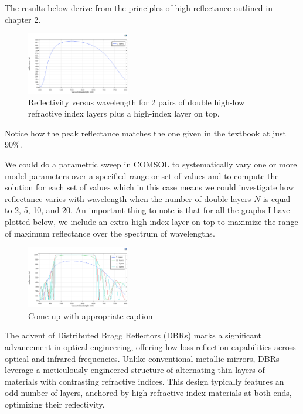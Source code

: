 The results below derive from the principles of high reflectance outlined in chapter 2.

\begin{figure}[ht!]
  \centering
  \includegraphics[width=0.4\textwidth]{Chapters/Figures/Chapter 4 Figures/High-Reflectance (5 Layers).png}
  \caption{Reflectivity versus wavelength for 2 pairs of double high-low refractive index layers plus a high-index layer on top.}
  \label{fig:COMSOL 5 layer results}
\end{figure}

Notice how the peak reflectance matches the one given in the textbook at just 90\%.

We could do a parametric sweep in COMSOL to systematically vary one or more model parameters over a specified range or set of values and to compute the solution for each set of values which in this case means we could investigate how reflectance varies with wavelength when the number of double layers $N$ is equal to 2, 5, 10, and 20. An important thing to note is that for all the graphs I have plotted below, we include an extra high-index layer on top to maximize the range of maximum reflectance over the spectrum of wavelengths.

\begin{figure}[ht!]
  \centering
  \includegraphics[width=0.4\textwidth]{Chapters/Figures/Chapter 4 Figures/High-Reflectance (5, 11, 21, and 41 Layers).png}
  \caption{Come up with appropriate caption}
  \label{fig:Antireflective Figure c}
\end{figure}

The advent of Distributed Bragg Reflectors (DBRs) marks a significant advancement in optical engineering, offering low-loss reflection capabilities across optical and infrared frequencies. Unlike conventional metallic mirrors, DBRs leverage a meticulously engineered structure of alternating thin layers of materials with contrasting refractive indices. This design typically features an odd number of layers, anchored by high refractive index materials at both ends, optimizing their reflectivity. %

